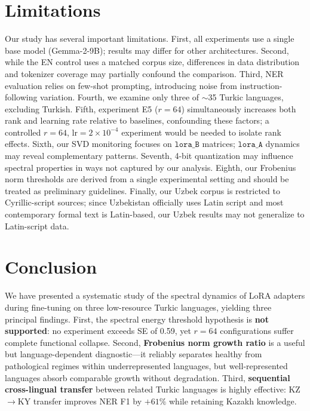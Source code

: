 \documentclass[11pt]{article}
\begin{document}
\section{Limitations}

Our study has several important limitations. First, all experiments use a single base model (Gemma-2-9B); results may differ for other architectures. Second, while the EN control uses a matched corpus size, differences in data distribution and tokenizer coverage may partially confound the comparison. Third, NER evaluation relies on few-shot prompting, introducing noise from instruction-following variation. Fourth, we examine only three of $\sim$35 Turkic languages, excluding Turkish. Fifth, experiment E5 ($r{=}64$) simultaneously increases both rank and learning rate relative to baselines, confounding these factors; a controlled $r{=}64$, $\text{lr}{=}2 \times 10^{-4}$ experiment would be needed to isolate rank effects. Sixth, our SVD monitoring focuses on $\texttt{lora\_B}$ matrices; $\texttt{lora\_A}$ dynamics may reveal complementary patterns. Seventh, 4-bit quantization may influence spectral properties in ways not captured by our analysis. Eighth, our Frobenius norm thresholds are derived from a single experimental setting and should be treated as preliminary guidelines. Finally, our Uzbek corpus is restricted to Cyrillic-script sources; since Uzbekistan officially uses Latin script and most contemporary formal text is Latin-based, our Uzbek results may not generalize to Latin-script data.

\section{Conclusion}

We have presented a systematic study of the spectral dynamics of LoRA adapters during fine-tuning on three low-resource Turkic languages, yielding three principal findings. First, the spectral energy threshold hypothesis is \textbf{not supported}: no experiment exceeds SE of 0.59, yet $r{=}64$ configurations suffer complete functional collapse. Second, \textbf{Frobenius norm growth ratio} is a useful but language-dependent diagnostic---it reliably separates healthy from pathological regimes within underrepresented languages, but well-represented languages absorb comparable growth without degradation. Third, \textbf{sequential cross-lingual transfer} between related Turkic languages is highly effective: KZ$\rightarrow$KY transfer improves NER F1 by $+61\%$ while retaining Kazakh knowledge.
\end{document}
